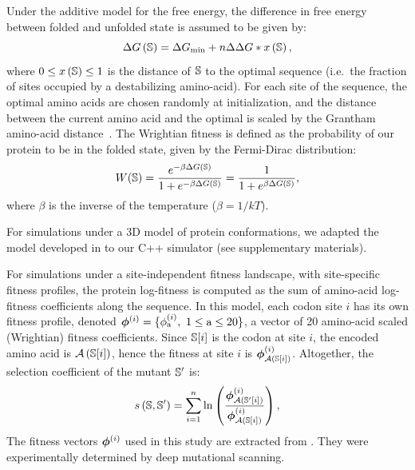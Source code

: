\documentclass[authoryear]{elsarticle} %
\begin{document}
Under the additive model for the free energy, the difference in free energy between folded and unfolded state is assumed to be given by:
\begin{equation*}
    \Delta G\left(\mathbb{S}\right) = \Delta G_{\text{min}} + n \Delta \Delta G * x\left(\mathbb{S}\right),
\end{equation*}
where $0 \leq x\left(\mathbb{S}\right) \leq 1$ is the distance of $\mathbb{S}$ to the optimal sequence (i.e.~the fraction of sites occupied by a destabilizing amino-acid).
For each site of the sequence, the optimal amino acids are chosen randomly at initialization, and the distance between the current amino acid and the optimal is scaled by the Grantham amino-acid distance~\citep{Grantham1974}.
The Wrightian fitness is defined as the probability of our protein to be in the folded state, given by the Fermi-Dirac distribution:
\begin{equation}
    W (\mathbb{S}) = \dfrac{e^{-\beta \Delta G\left(\mathbb{S}\right) }}{1 + e^{-\beta \Delta G\left(\mathbb{S}\right) }} = \dfrac{1}{1 + e^{\beta \Delta G\left(\mathbb{S}\right) }},
\end{equation}
where $\beta$ is the inverse of the temperature ($\beta=1/kT$).

For simulations under a 3D model of protein conformations, we adapted the model developed in \citet{Goldstein2017} to our C++ simulator (see  supplementary materials).

For simulations under a site-independent fitness landscape, with site-specific fitness profiles, the protein log-fitness is computed as the sum of amino-acid log-fitness coefficients along the sequence.
In this model, each {codon} site $i$ has its own fitness profile, denoted $\bm{\phi}^{(i)} = \{ \phi^{(i)}_{\text{a}},\ 1 \leq \text{a} \leq 20 \}$, a vector of 20 amino-acid scaled (Wrightian) fitness coefficients.
Since $\mathbb{S}[ i ]$ is the {codon} at site $i$, the encoded amino acid is $\mathcal{A} \left( \mathbb{S}[ i ] \right)$, hence the fitness at site $i$ is $\bm{\phi}^{(i)}_{\mathcal{A} \left( \mathbb{S}[ i ] \right)}$.
Altogether, the selection coefficient of the mutant $\mathbb{S}'$ is:
\begin{equation}
    s \left( \mathbb{S},\mathbb{S}'\right) = \sum\limits_{ i = 1 }^{n} \ln \left( \dfrac{\bm{\phi}^{(i)}_{\mathcal{A} \left( \mathbb{S}'[ i ] \right)}}{\bm{\phi}^{(i)}_{\mathcal{A} \left( \mathbb{S}[ i ] \right)}} \right),
\end{equation}
The fitness vectors $\bm{\phi}^{(i)}$ used in this study are extracted from \citet{Bloom2017}.
They were experimentally determined by deep mutational scanning.
\end{document}
